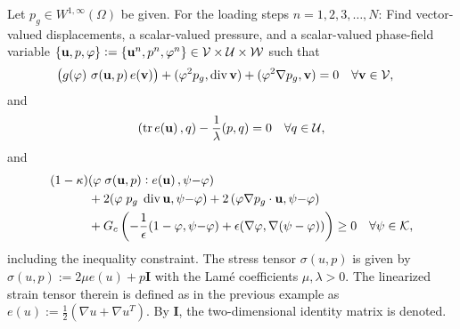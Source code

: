 \begin{Problem}
\label{form_mixed}
Let $p_g\in W^{1,\infty}(\Omega)$ be given. 
For the loading steps $n=1,2,3,\ldots, N$: Find vector-valued displacements,
a scalar-valued pressure, 
and a
scalar-valued phase-field variable 
$\{\mathbf{u},p,\varphi\} := \{\mathbf{u}^n,p^n,\varphi^n\} \in \mathcal{V} \times \mathcal{U} \times \mathcal{W}$ such that
\begin{equation}\label{eq_u_mixed}
\begin{aligned}
\left(g(\varphi)\ \sigma(\mathbf{u},p)\,e({\mathbf{v}})\right) 
+({\varphi}^{2} p_g, \operatorname{div}  {\mathbf{v}}) 
+ ({\varphi}^{2} \nabla p_g,  {\mathbf{v}}) 
&=0 \quad \forall \mathbf{v}\in \mathcal{V},
\end{aligned}
\end{equation}
and 
\begin{equation}
\begin{aligned}
(\operatorname{tr}e( {\mathbf{u}})\,, q) - \frac{1}{\lambda} (p,q)
=0 \quad \forall q\in \mathcal{U},
\end{aligned}
\end{equation}
and
\begin{equation}
\begin{aligned}
 (1-\kappa) &({\varphi} \;\sigma(\mathbf{u},p):e( \mathbf{u})\,, \psi {-\varphi}) \\
&+  2 ({\varphi}\;  p_g\; \operatorname{div}  \mathbf{u},\psi{-\varphi})
+ 2\, ({\varphi} \nabla p_g\cdot  {\mathbf{u}},\psi{-\varphi}) 
\\
&+  G_c  \left( -\frac{1}{\epsilon} (1-\varphi,\psi{-\varphi}) + \epsilon (\nabla
\varphi, \nabla (\psi - {\varphi}))   \right)  \geq  0
\quad \forall \psi \in \mathcal{K},
\end{aligned}
\end{equation}
including the inequality constraint. The stress tensor $\sigma(u,p)$ is given by $\sigma(u,p) := 2 \mu e(u) + p \textbf{I}$ with the Lam\'e coefficients $\mu,\lambda > 0$.
The linearized strain tensor therein is defined as in the previous example as $e(u):=\frac{1}{2} (\nabla u + \nabla u^T)$. 
By $\textbf{I}$, the two-dimensional identity matrix is denoted.
\end{Problem}


